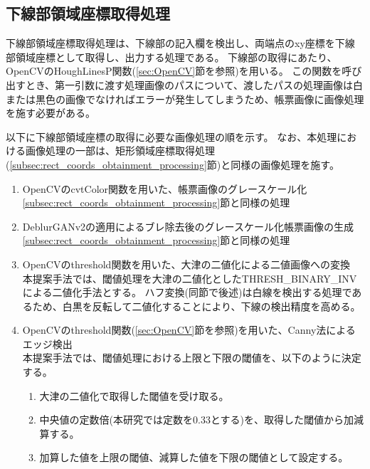 \subsection{下線部領域座標取得処理}\label{subsec:underline_coords_obtainment_processing}
下線部領域座標取得処理は、下線部の記入欄を検出し、両端点のxy座標を下線部領域座標として取得し、出力する処理である。
下線部の取得にあたり、OpenCVのHoughLinesP関数(\ref{sec:OpenCV}節を参照)を用いる。
この関数を呼び出すとき、第一引数に渡す処理画像のパスについて、渡したパスの処理画像は白または黒色の画像でなければエラーが発生してしまうため、帳票画像に画像処理を施す必要がある。

以下に下線部領域座標の取得に必要な画像処理の順を示す。
なお、本処理における画像処理の一部は、矩形領域座標取得処理(\ref{subsec:rect_coords_obtainment_processing}節)と同様の画像処理を施す。

\begin{enumerate}
    \item OpenCVのcvtColor関数を用いた、帳票画像のグレースケール化\\
        \ref{subsec:rect_coords_obtainment_processing}節と同様の処理
    \item DeblurGANv2の適用によるブレ除去後のグレースケール化帳票画像の生成\\
        \ref{subsec:rect_coords_obtainment_processing}節と同様の処理
    \item OpenCVのthreshold関数を用いた、大津の二値化による二値画像への変換\\
        本提案手法では、閾値処理を大津の二値化としたTHRESH\_BINARY\_INVによる二値化手法とする。
        ハフ変換(同節で後述)は白線を検出する処理であるため、白黒を反転して二値化することにより、下線の検出精度を高める。
    \item OpenCVのthreshold関数(\ref{sec:OpenCV}節を参照)を用いた、Canny法によるエッジ検出\\
        本提案手法では、閾値処理における上限と下限の閾値を、以下のように決定する。
        \begin{enumerate}
            \item 大津の二値化で取得した閾値を受け取る。
            \item 中央値の定数倍(本研究では定数を0.33とする)を、取得した閾値から加減算する。
            \item 加算した値を上限の閾値、減算した値を下限の閾値として設定する。
        \end{enumerate}
\end{enumerate}

